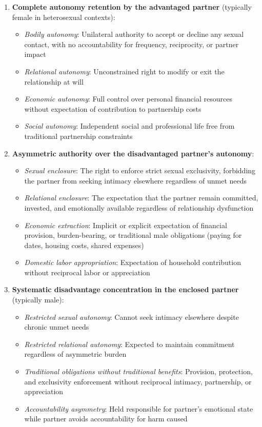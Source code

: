 \documentclass[12pt,openany]{book}
\numberwithin{equation}{chapter}
\begin{document}
\begin{enumerate}
    \item \textbf{Complete autonomy retention by the advantaged partner} (typically female in heterosexual contexts):
    \begin{itemize}
        \item \textit{Bodily autonomy}: Unilateral authority to accept or decline any sexual contact, with no accountability for frequency, reciprocity, or partner impact
        \item \textit{Relational autonomy}: Unconstrained right to modify or exit the relationship at will
        \item \textit{Economic autonomy}: Full control over personal financial resources without expectation of contribution to partnership costs
        \item \textit{Social autonomy}: Independent social and professional life free from traditional partnership constraints
    \end{itemize}
    
    \item \textbf{Asymmetric authority over the disadvantaged partner's autonomy}:
    \begin{itemize}
        \item \textit{Sexual enclosure}: The right to enforce strict sexual exclusivity, forbidding the partner from seeking intimacy elsewhere regardless of unmet needs
        \item \textit{Relational enclosure}: The expectation that the partner remain committed, invested, and emotionally available regardless of relationship dysfunction
        \item \textit{Economic extraction}: Implicit or explicit expectation of financial provision, burden-bearing, or traditional male obligations (paying for dates, housing costs, shared expenses)
        \item \textit{Domestic labor appropriation}: Expectation of household contribution without reciprocal labor or appreciation
    \end{itemize}
    
    \item \textbf{Systematic disadvantage concentration in the enclosed partner} (typically male):
    \begin{itemize}
        \item \textit{Restricted sexual autonomy}: Cannot seek intimacy elsewhere despite chronic unmet needs
        \item \textit{Restricted relational autonomy}: Expected to maintain commitment regardless of asymmetric burden
        \item \textit{Traditional obligations without traditional benefits}: Provision, protection, and exclusivity enforcement without reciprocal intimacy, partnership, or appreciation
        \item \textit{Accountability asymmetry}: Held responsible for partner's emotional state while partner avoids accountability for harm caused
    \end{itemize}
\end{enumerate}
\end{document}
